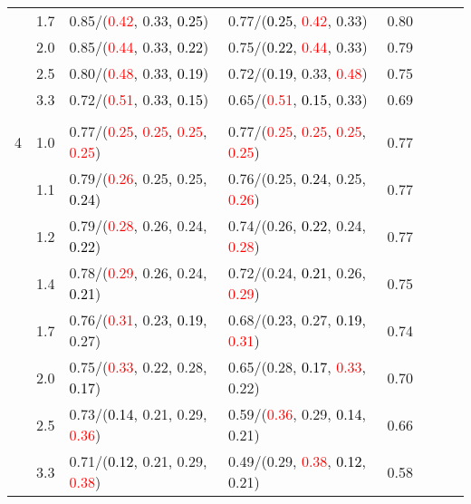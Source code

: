 \documentclass[10pt,a4paper]{report}
\begin{document}
\begin{table}[!htbp]
\begin{center}
{\begin{tabular}{ccllcccc}
			&1.7&0.85/(\textcolor{red}{0.42}, 0.33, \textcolor{black}{0.25})&0.77/(\textcolor{black}{0.25}, \textcolor{red}{0.42}, 0.33)&0.80\\
			&2.0&0.85/(\textcolor{red}{0.44}, 0.33, \textcolor{black}{0.22})&0.75/(\textcolor{black}{0.22}, \textcolor{red}{0.44}, 0.33)&0.79\\
			&2.5&0.80/(\textcolor{red}{0.48}, 0.33, \textcolor{black}{0.19})&0.72/(\textcolor{black}{0.19}, 0.33, \textcolor{red}{0.48})&0.75\\
			&3.3&0.72/(\textcolor{red}{0.51}, 0.33, \textcolor{black}{0.15})&0.65/(\textcolor{red}{0.51}, \textcolor{black}{0.15}, 0.33)&0.69\\
			&&&&\\
			4			&1.0&0.77/(\textcolor{red}{0.25}, \textcolor{red}{0.25}, \textcolor{red}{0.25}, \textcolor{red}{0.25})&0.77/(\textcolor{red}{0.25}, \textcolor{red}{0.25}, \textcolor{red}{0.25}, \textcolor{red}{0.25})&0.77\\
			&1.1&0.79/(\textcolor{red}{0.26}, 0.25, 0.25, \textcolor{black}{0.24})&0.76/(0.25, \textcolor{black}{0.24}, 0.25, \textcolor{red}{0.26})&0.77\\
			&1.2&0.79/(\textcolor{red}{0.28}, 0.26, 0.24, \textcolor{black}{0.22})&0.74/(0.26, \textcolor{black}{0.22}, 0.24, \textcolor{red}{0.28})&0.77\\
			&1.4&0.78/(\textcolor{red}{0.29}, 0.26, 0.24, \textcolor{black}{0.21})&0.72/(0.24, \textcolor{black}{0.21}, 0.26, \textcolor{red}{0.29})&0.75\\
			&1.7&0.76/(\textcolor{red}{0.31}, 0.23, \textcolor{black}{0.19}, 0.27)&0.68/(0.23, 0.27, \textcolor{black}{0.19}, \textcolor{red}{0.31})&0.74\\
			&2.0&0.75/(\textcolor{red}{0.33}, 0.22, 0.28, \textcolor{black}{0.17})&0.65/(0.28, \textcolor{black}{0.17}, \textcolor{red}{0.33}, 0.22)&0.70\\
			&2.5&0.73/(\textcolor{black}{0.14}, 0.21, 0.29, \textcolor{red}{0.36})&0.59/(\textcolor{red}{0.36}, 0.29, \textcolor{black}{0.14}, 0.21)&0.66\\
			&3.3&0.71/(\textcolor{black}{0.12}, 0.21, 0.29, \textcolor{red}{0.38})&0.49/(0.29, \textcolor{red}{0.38}, \textcolor{black}{0.12}, 0.21)&0.58\\
			\bottomrule
		\end{tabular}}
	\end{center}
\end{table}
\end{document}
